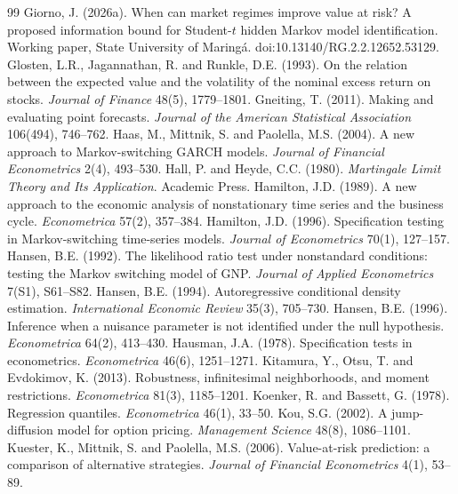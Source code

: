 \documentclass[11pt,a4paper]{article}
\theoremstyle{definition}
\theoremstyle{remark}
\begin{document}
\begin{thebibliography}{99}
 Giorno, J. (2026a). When can market regimes improve value at risk? A proposed information bound for Student-$t$ hidden Markov model identification. Working paper, State University of Maring\'a. doi:10.13140/RG.2.2.12652.53129.
 Glosten, L.R., Jagannathan, R. and Runkle, D.E. (1993). On the relation between the expected value and the volatility of the nominal excess return on stocks. \emph{Journal of Finance} 48(5), 1779--1801.
 Gneiting, T. (2011). Making and evaluating point forecasts. \emph{Journal of the American Statistical Association} 106(494), 746--762.
 Haas, M., Mittnik, S. and Paolella, M.S. (2004). A new approach to Markov-switching GARCH models. \emph{Journal of Financial Econometrics} 2(4), 493--530.
 Hall, P. and Heyde, C.C. (1980). \emph{Martingale Limit Theory and Its Application}. Academic Press.
 Hamilton, J.D. (1989). A new approach to the economic analysis of nonstationary time series and the business cycle. \emph{Econometrica} 57(2), 357--384.
 Hamilton, J.D. (1996). Specification testing in Markov-switching time-series models. \emph{Journal of Econometrics} 70(1), 127--157.
 Hansen, B.E. (1992). The likelihood ratio test under nonstandard conditions: testing the Markov switching model of GNP. \emph{Journal of Applied Econometrics} 7(S1), S61--S82.
 Hansen, B.E. (1994). Autoregressive conditional density estimation. \emph{International Economic Review} 35(3), 705--730.
 Hansen, B.E. (1996). Inference when a nuisance parameter is not identified under the null hypothesis. \emph{Econometrica} 64(2), 413--430.
 Hausman, J.A. (1978). Specification tests in econometrics. \emph{Econometrica} 46(6), 1251--1271.
 Kitamura, Y., Otsu, T. and Evdokimov, K. (2013). Robustness, infinitesimal neighborhoods, and moment restrictions. \emph{Econometrica} 81(3), 1185--1201.
 Koenker, R. and Bassett, G. (1978). Regression quantiles. \emph{Econometrica} 46(1), 33--50.
 Kou, S.G. (2002). A jump-diffusion model for option pricing. \emph{Management Science} 48(8), 1086--1101.
 Kuester, K., Mittnik, S. and Paolella, M.S. (2006). Value-at-risk prediction: a comparison of alternative strategies. \emph{Journal of Financial Econometrics} 4(1), 53--89.

\end{thebibliography}
\end{document}
